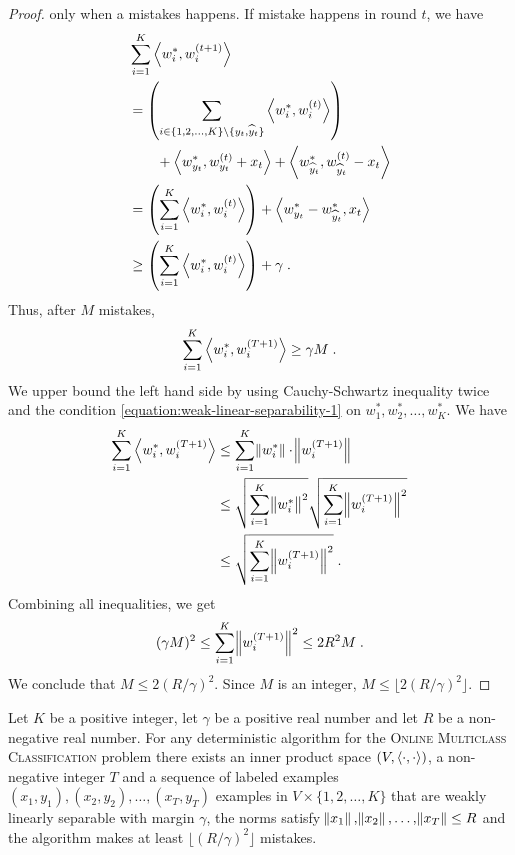 \begin{proof}
only when a mistakes happens. If mistake happens in round $t$, we have
\begin{align*}
& \sum_{i=1}^K \left\langle w_i^*, w_i^{(t+1)} \right\rangle \\
& = \left( \sum_{i \in \{1,2,\dots,K\} \setminus \{y_t, \widehat y_t\}} \left\langle w_i^*, w_i^{(t)} \right\rangle \right) \\
& \qquad + \left\langle w_{y_t}^*, w_{y_t}^{(t)} + x_t \right\rangle + \left\langle w_{\widehat y_t}^*, w_{\widehat y_t}^{(t)} - x_t \right\rangle \\
& = \left( \sum_{i=1}^K \left\langle w_i^*, w_i^{(t)} \right\rangle \right) + \left\langle w_{y_t}^* - w_{\widehat y_t}^*, x_t \right\rangle \\
& \ge  \left( \sum_{i=1}^K \left\langle w_i^*, w_i^{(t)} \right\rangle \right) + \gamma \; .
\end{align*}
Thus, after $M$ mistakes,
$$
\sum_{i=1}^K \left\langle w_i^*, w_i^{(T+1)} \right\rangle \ge \gamma M \; .
$$
We upper bound the left hand side by using Cauchy-Schwartz inequality twice and
the condition \eqref{equation:weak-linear-separability-1} on $w_1^*, w_2^*, \dots,
w_K^*$. We have
\begin{align*}
\sum_{i=1}^K \left\langle w_i^*, w_i^{(T+1)} \right\rangle
& \le \sum_{i=1}^K \norm{w_i^*} \cdot \norm{w_i^{(T+1)}} \\
& \le \sqrt{\sum_{i=1}^K \norm{w_i^*}^2} \sqrt{\sum_{i=1}^K \norm{w_i^{(T+1)}}^2} \\
& \le \sqrt{\sum_{i=1}^K \norm{w_i^{(T+1)}}^2} \; .
\end{align*}
Combining all inequalities, we get
$$
(\gamma M)^2 \le \sum_{i=1}^K \norm{w_i^{(T+1)}}^2 \le 2R^2 M \; .
$$
We conclude that $M \le 2(R/\gamma)^2$. Since $M$ is an integer, $M \le \lfloor 2(R/\gamma)^2 \rfloor$.
\end{proof}


\begin{theorem}
\label{theorem:online-multiclass-classification-mistake-lower-bound}
Let $K$ be a positive integer, let $\gamma$ be a positive real number and let
$R$ be a non-negative real number. For any deterministic algorithm for the
\textsc{Online Multiclass Classification} problem there exists an
inner product space $(V, \left\langle \cdot, \cdot \right\rangle)$, a non-negative integer $T$ and a
sequence of labeled examples $(x_1, y_1), (x_2, y_2), \dots, (x_T, y_T)$
examples in $V \times \{1,2,\dots,K\}$ that are weakly linearly separable with margin
$\gamma$, the norms satisfy $\norm{x_1}, \norm{x_2}, \dots, \norm{x_T} \le R$
and the algorithm makes at least $\lfloor (R/\gamma)^2 \rfloor$ mistakes.
\end{theorem}

